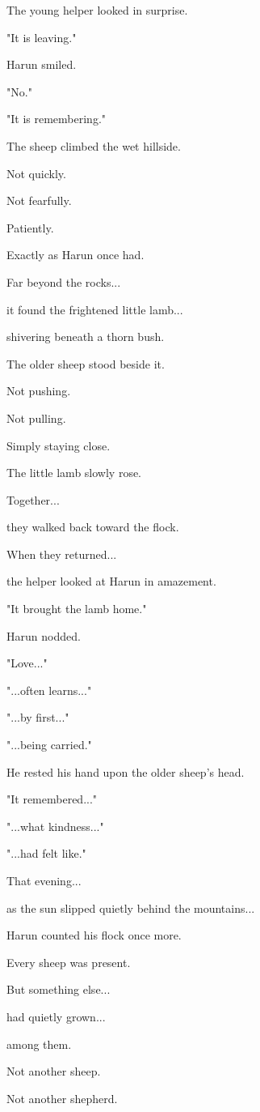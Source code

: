 \documentclass[12pt,openany]{book}
\begin{document}
The young helper looked in surprise.

"It is leaving."

Harun smiled.

"No."

"It is remembering."

The sheep climbed the wet hillside.

Not quickly.

Not fearfully.

Patiently.

Exactly as Harun once had.

Far beyond the rocks...

it found the frightened little lamb...

shivering beneath a thorn bush.

The older sheep stood beside it.

Not pushing.

Not pulling.

Simply staying close.

The little lamb slowly rose.

Together...

they walked back toward the flock.

When they returned...

the helper looked at Harun in amazement.

"It brought the lamb home."

Harun nodded.

"Love..."

"...often learns..."

"...by first..."

"...being carried."

He rested his hand upon the older sheep's head.

"It remembered..."

"...what kindness..."

"...had felt like."

That evening...

as the sun slipped quietly behind the mountains...

Harun counted his flock once more.

Every sheep was present.

But something else...

had quietly grown...

among them.

Not another sheep.

Not another shepherd.
\end{document}
